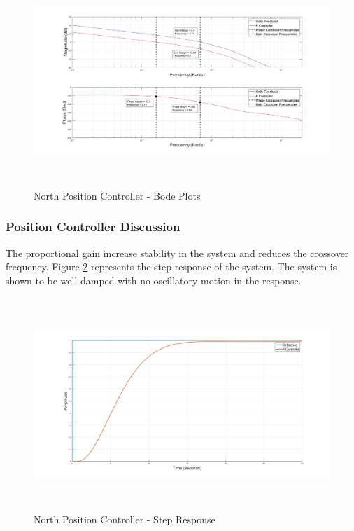 \documentclass[12pt]{report}
\begin{document}
\begin{figure}[H]
	\centering
	\includegraphics[height = 8cm]{../Design/Matlab/Controllers/north_position_bode.jpg}
	\caption{North Position Controller -  Bode Plots}
	\label{IM_NorthPosControlBode}
\end{figure}

\subsubsection{Position Controller Discussion}
The proportional gain increase stability in the system and reduces the crossover frequency. Figure \ref{IM_NorthPosControlStep} represents the step response of the system. The system is shown to be well damped with no oscillatory motion in the response. 

\begin{figure}[H]
	\centering
	\includegraphics[height = 8cm]{../Design/Matlab/Controllers/north_position_step.jpg}
	\caption{North Position Controller -  Step Response}
	\label{IM_NorthPosControlStep}
\end{figure}
\end{document}

